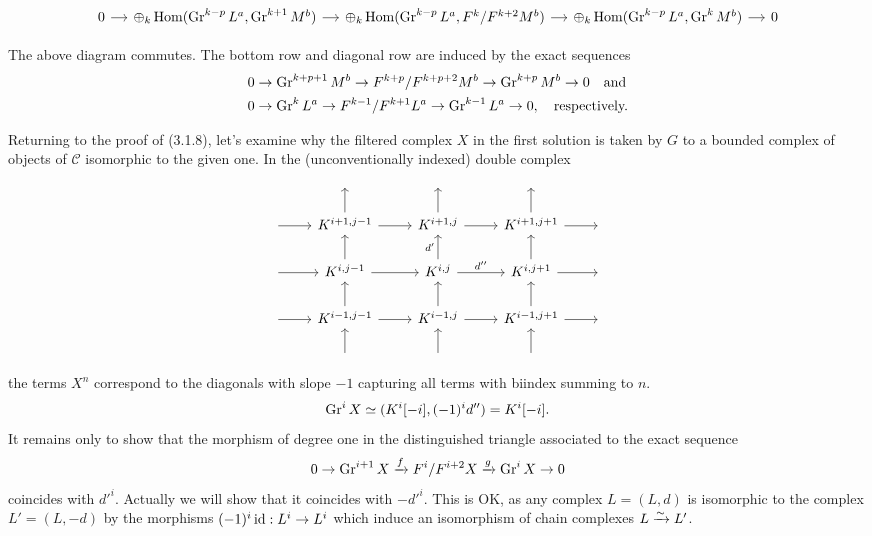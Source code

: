 \documentclass[deligne.tex]{subfiles}
\begin{document}
\begin{landscape}
\begin{ceqn}
\begin{equation*}
\begin{tikzcd}[column sep=small]
	0\arrow[r]&\oplus_k\Hom(\Gr^{k-p}L^a,\Gr^{k+1}M^b)\arrow[r]
	&\oplus_k\Hom(\Gr^{k-p}L^a,F^k/F^{k+2}M^b)\arrow[r]
	&\oplus_k\Hom(\Gr^{k-p}L^a,\Gr^kM^b)\arrow[r]&0
\end{tikzcd}\end{equation*}\end{ceqn}
The above diagram commutes.
The bottom row and diagonal row are induced by the exact sequences
\begin{align*}
	&0\rightarrow\operatorname{Gr}^{k+p+1}M^b\rightarrow F^{k+p}/F^{k+p+2}M^b\rightarrow\operatorname{Gr}^{k+p}M^b\rightarrow0\quad\text{and} \\
	&0\rightarrow\operatorname{Gr}^kL^a\rightarrow F^{k-1}/F^{k+1}L^a\rightarrow\operatorname{Gr}^{k-1}L^a\rightarrow0,\quad\text{respectively.}
\end{align*}
\end{landscape}
\restoregeometry
Returning to the proof of (3.1.8), let's examine why the filtered complex
$X$ in the first solution is taken by $G$ to a bounded complex of objects 
of $\mathcal C$ isomorphic to the given one.
In the (unconventionally indexed) double complex
\begin{equation*}\begin{tikzcd}
	&\;&\;&\; \\
	\;\arrow[r]&K^{i+1,j-1}\arrow[u]\arrow[r]
	&K^{i+1,j}\arrow[u]\arrow[r]
	&K^{i+1,j+1}\arrow[u]\arrow[r]&\; \\
	\;\arrow[r]&K^{i,j-1}\arrow[u]\arrow[r]
	&K^{i,j}\arrow[u,"d'"]\arrow[r,"d''"]
	&K^{i,j+1}\arrow[u]\arrow[r]&\; \\
	\;\arrow[r]&K^{i-1,j-1}\arrow[u]\arrow[r]
	&K^{i-1,j}\arrow[u]\arrow[r]
	&K^{i-1,j+1}\arrow[u]\arrow[r]&\; \\
	&\;\arrow[u]&\;\arrow[u]&\;\arrow[u]
\end{tikzcd}\end{equation*}
the terms $X^n$ correspond to the diagonals with
slope $-1$ capturing all terms with biindex summing to $n$.
\begin{equation*}
	\operatorname{Gr}^iX\simeq(K^i[-i],(-1)^id'')=K^i[-i].
\end{equation*}
It remains only to show that the morphism of degree one in the 
distinguished triangle associated to the exact sequence
\begin{equation*}
	0\rightarrow\operatorname{Gr}^{i+1}X\xrightarrow f F^i/F^{i+2}X\xrightarrow g\operatorname{Gr}^iX\rightarrow0
\end{equation*}
coincides with $d'^i$. Actually we will show that it coincides with
$-d'^i$. This is OK, as any complex $L=(L,d)$ is isomorphic to the
complex $L'=(L,-d)$ by the morphisms $(-1)^i\operatorname{id}:L^i\rightarrow L^i$ which induce an
isomorphism of chain complexes $L\xrightarrow\sim L'$.
\end{document}
